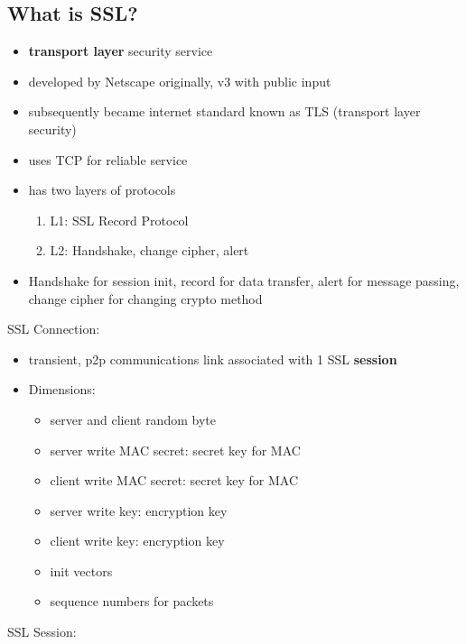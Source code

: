\documentclass{article}
\begin{document}
\subsection{What is SSL?}
\begin{itemize}
    \item \textbf{transport layer} security service
    \item developed by Netscape originally, v3 with public input
    \item subsequently became internet standard known as TLS (transport layer security)
    \item uses TCP for reliable service
    \item has two layers of protocols
    \begin{enumerate}
        \item L1: SSL Record Protocol
        \item L2: Handshake, change cipher, alert
    \end{enumerate}
    \item Handshake for session init, record for data transfer, alert for message passing, change cipher for changing crypto method
\end{itemize}
SSL Connection:
\begin{itemize}
    \item transient, p2p communications link associated with 1 SSL \textbf{session}
    \item Dimensions:
    \begin{itemize}
        \item server and client random byte
        \item server write MAC secret: secret key for MAC
        \item client write MAC secret: secret key for MAC
        \item server write key: encryption key
        \item client write key: encryption key
        \item init vectors
        \item sequence numbers for packets
    \end{itemize}
\end{itemize}
SSL Session:
\end{document}
